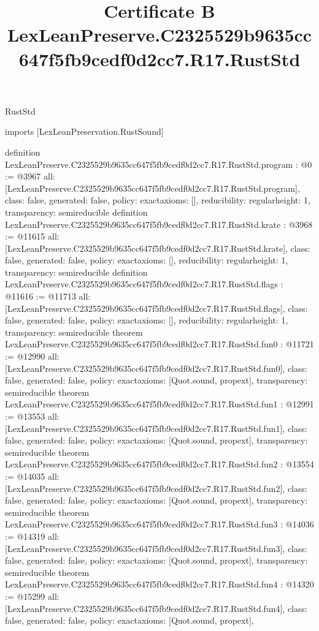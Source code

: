 \begin{lexlean}{RustStd}
\title{Certificate B LexLeanPreserve.C2325529b9635cc647f5fb9cedf0d2cc7.R17.RustStd}
\begin{coremodule}
imports [LexLeanPreservation.RustSound]

definition LexLeanPreserve.C2325529b9635cc647f5fb9cedf0d2cc7.R17.RustStd.program : @0 := @3967 {
  all: [LexLeanPreserve.C2325529b9635cc647f5fb9cedf0d2cc7.R17.RustStd.program],
  class: false,
  generated: false,
  policy: exact{axioms: []},
  reducibility: regular{height: 1},
  transparency: semireducible
}
definition LexLeanPreserve.C2325529b9635cc647f5fb9cedf0d2cc7.R17.RustStd.krate : @3968 := @11615 {
  all: [LexLeanPreserve.C2325529b9635cc647f5fb9cedf0d2cc7.R17.RustStd.krate],
  class: false,
  generated: false,
  policy: exact{axioms: []},
  reducibility: regular{height: 1},
  transparency: semireducible
}
definition LexLeanPreserve.C2325529b9635cc647f5fb9cedf0d2cc7.R17.RustStd.flags : @11616 := @11713 {
  all: [LexLeanPreserve.C2325529b9635cc647f5fb9cedf0d2cc7.R17.RustStd.flags],
  class: false,
  generated: false,
  policy: exact{axioms: []},
  reducibility: regular{height: 1},
  transparency: semireducible
}
theorem LexLeanPreserve.C2325529b9635cc647f5fb9cedf0d2cc7.R17.RustStd.fun0 : @11721 := @12990 {
  all: [LexLeanPreserve.C2325529b9635cc647f5fb9cedf0d2cc7.R17.RustStd.fun0],
  class: false,
  generated: false,
  policy: exact{axioms: [Quot.sound, propext]},
  transparency: semireducible
}
theorem LexLeanPreserve.C2325529b9635cc647f5fb9cedf0d2cc7.R17.RustStd.fun1 : @12991 := @13553 {
  all: [LexLeanPreserve.C2325529b9635cc647f5fb9cedf0d2cc7.R17.RustStd.fun1],
  class: false,
  generated: false,
  policy: exact{axioms: [Quot.sound, propext]},
  transparency: semireducible
}
theorem LexLeanPreserve.C2325529b9635cc647f5fb9cedf0d2cc7.R17.RustStd.fun2 : @13554 := @14035 {
  all: [LexLeanPreserve.C2325529b9635cc647f5fb9cedf0d2cc7.R17.RustStd.fun2],
  class: false,
  generated: false,
  policy: exact{axioms: [Quot.sound, propext]},
  transparency: semireducible
}
theorem LexLeanPreserve.C2325529b9635cc647f5fb9cedf0d2cc7.R17.RustStd.fun3 : @14036 := @14319 {
  all: [LexLeanPreserve.C2325529b9635cc647f5fb9cedf0d2cc7.R17.RustStd.fun3],
  class: false,
  generated: false,
  policy: exact{axioms: [Quot.sound, propext]},
  transparency: semireducible
}
theorem LexLeanPreserve.C2325529b9635cc647f5fb9cedf0d2cc7.R17.RustStd.fun4 : @14320 := @15299 {
  all: [LexLeanPreserve.C2325529b9635cc647f5fb9cedf0d2cc7.R17.RustStd.fun4],
  class: false,
  generated: false,
  policy: exact{axioms: [Quot.sound, propext]},
}
\end{coremodule}
\end{lexlean}
